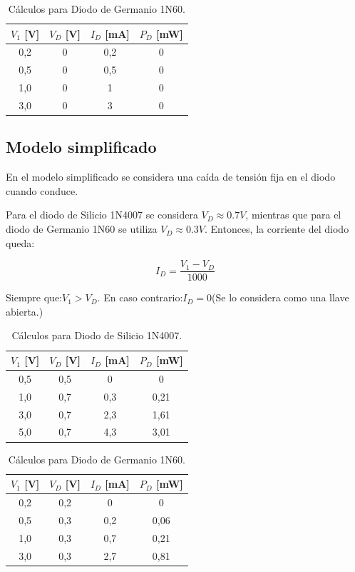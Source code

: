 \vspace{0.5cm}

\begin{table}[H]
\centering
\caption{Cálculos para Diodo de Germanio 1N60.}
\begin{tabular}{c c c c}
\hline
$V_1$ [V] & $V_D$ [V] & $I_D$ [mA] & $P_D$ [mW] \\
\hline
0,2 &0 &0,2 &0 \\
0,5 &0 &0,5 &0 \\
1,0 &0 &1 &0 \\
3,0 &0 &3 &0 \\
\hline
\end{tabular}
\end{table}

\subsection{Modelo simplificado}

En el modelo simplificado se considera una caída de tensión fija en el diodo cuando conduce.

Para el diodo de Silicio 1N4007 se considera $V_D \approx 0.7V$, mientras que para el diodo de Germanio 1N60 se utiliza $V_D \approx 0.3V$.
Entonces, la corriente del diodo queda:

\[
I_D = \frac{V_1 - V_D}{1000}
\]

Siempre que:$V_1 > V_D$.
En caso contrario:$I_D = 0$(Se lo considera como una llave abierta.)
\begin{table}[H]
\centering
\caption{Cálculos para Diodo de Silicio 1N4007.}
\begin{tabular}{c c c c}
\hline
$V_1$ [V] & $V_D$ [V] & $I_D$ [mA] & $P_D$ [mW] \\
\hline
0,5 &0,5 &0&0 \\
1,0 &0,7 &0,3 &0,21 \\
3,0 &0,7 &2,3&1,61 \\
5,0 &0,7 &4,3&3,01 \\
\hline
\end{tabular}
\end{table}

\vspace{0.5cm}

\begin{table}[H]
\centering
\caption{Cálculos para Diodo de Germanio 1N60.}
\begin{tabular}{c c c c}
\hline
$V_1$ [V] & $V_D$ [V] & $I_D$ [mA] & $P_D$ [mW] \\
\hline
0,2 &0,2 &0 &0 \\
0,5 &0,3 &0,2 &0,06 \\
1,0 &0,3 &0,7 &0,21 \\
3,0 &0,3 &2,7 &0,81 \\
\hline
\end{tabular}
\end{table}

